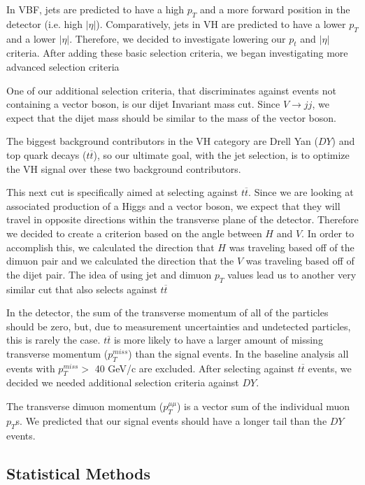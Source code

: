 \documentclass[12pt]{article}
\begin{document}
In VBF, jets are predicted to have a high $p_{T}$ and a more forward position in the detector (i.e. high $|\eta|$). 
Comparatively, jets in VH are predicted to have a lower $p_{T}$ and a lower $|\eta|$. 
Therefore, we decided to investigate lowering our $p_{t}$ and $|\eta|$ criteria. After adding these basic selection criteria,
we began investigating more advanced selection criteria

One of our additional selection criteria, that discriminates against events not containing a vector boson, is our dijet Invariant mass cut. 
Since $V \rightarrow jj$, we expect that the dijet mass should be similar to the mass of the vector boson. 

The biggest background contributors in the VH category are Drell Yan ($DY$) and top quark decays ($t\overline{t}$), 
so our ultimate goal, with the jet selection, is to optimize the VH signal over these two background contributors.

This next cut is specifically aimed at selecting against $t\overline{t}$.
Since we are looking at associated production of a Higgs and a vector boson, we expect that they will 
travel in opposite directions within the transverse plane of the detector. 
Therefore we decided to create a criterion based on the angle between $H$ and $V$. 
In order to accomplish this, we calculated the direction that $H$ was traveling based off of the dimuon pair 
and we calculated the direction that the $V$ was traveling based off of the dijet pair. 
The idea of using jet and dimuon $p_{T}$ values lead us to another very similar cut that also selects against $t\overline{t}$ 

In the detector, the sum of the transverse momentum of all of the particles should be zero, 
but, due to measurement uncertainties and undetected particles, this is rarely the case. 
$t\overline{t}$ is more likely to have a larger amount of missing transverse momentum ($p_{T}^{miss}$) than the signal events. 
In the baseline analysis all events with $p_{T}^{miss} >$ 40 GeV/c are excluded.
After selecting against $t\overline{t}$ events, we decided we needed additional selection criteria against $DY$.

The transverse dimuon momentum ($p_{T}^{\mu \mu}$) is a vector sum of the individual muon $p_{T}$s. 
We predicted that our signal events should have a longer tail than the $DY$ events.

\subsection{Statistical Methods}
\end{document}

